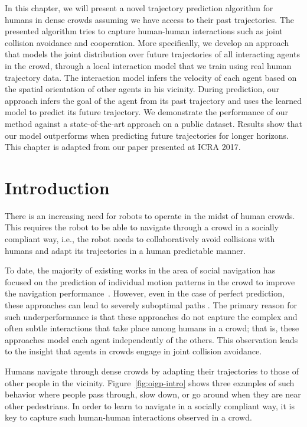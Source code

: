 In this chapter, we will present a novel trajectory prediction algorithm for humans in dense crowds assuming we have access to their past trajectories. The presented algorithm tries to capture human-human interactions such as joint collision avoidance and cooperation. More specifically, we develop an approach that models the joint distribution over future trajectories of all interacting agents in the crowd, through a local interaction model that we train using real human trajectory data. The interaction model infers the velocity of each agent based on the spatial orientation of other agents in his vicinity. During prediction, our approach infers the goal of the agent from its past trajectory and uses the learned model to predict its future trajectory. We demonstrate the performance of our method against a state-of-the-art approach on a public dataset. Results show that our model outperforms when predicting future trajectories for longer horizons. This chapter is adapted from our paper \cite{VemulaMO17} presented at ICRA 2017.

\section{Introduction}
\label{sec:oigp-introduction}

There is an increasing need for robots to operate in the midst of
human crowds. This requires the robot to be able to navigate through a
crowd in a socially compliant way, i.e., the robot needs to
collaboratively avoid collisions with humans and adapt its
trajectories in a human predictable manner.

To date, the majority of existing works in the area of social
navigation has focused on the prediction of individual motion patterns
in the crowd to improve the navigation performance~\cite{thompson09,
  bennewitz05, large04}. However, even in the case of perfect
prediction, these approaches can lead to
severely suboptimal paths \cite{trautman10}.
The primary reason for such underperformance is that these approaches
do not capture the complex and often subtle interactions that take
place among humans in a crowd; that is, these approaches model each
agent independently of the others. This observation leads to the
insight that agents in crowds engage in joint collision avoidance.

Humans navigate through dense crowds by adapting their trajectories
to those of other people in the vicinity.
Figure~\ref{fig:oigp-intro} shows three examples of such behavior where
people pass through, slow down, or go around when they are near
other pedestrians.
In order to learn to navigate in a socially compliant way, it is key
to capture such human-human interactions observed in a crowd.

